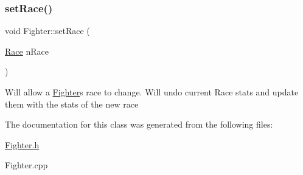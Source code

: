 \subsubsection{\texorpdfstring{set\+Race()}{setRace()}}
{\footnotesize\ttfamily void Fighter\+::set\+Race (\begin{DoxyParamCaption}\item[{\hyperlink{_entity_8h_aa2df4028f474807638d438104900b003}{Race}}]{n\+Race }\end{DoxyParamCaption})}

Will allow a \hyperlink{class_fighter}{Fighter}\textquotesingle{}s race to change. Will undo current Race stats and update them with the stats of the new race 

The documentation for this class was generated from the following files\+:\begin{DoxyCompactItemize}
\item 
\hyperlink{_fighter_8h}{Fighter.\+h}\item 
Fighter.\+cpp\end{DoxyCompactItemize}
